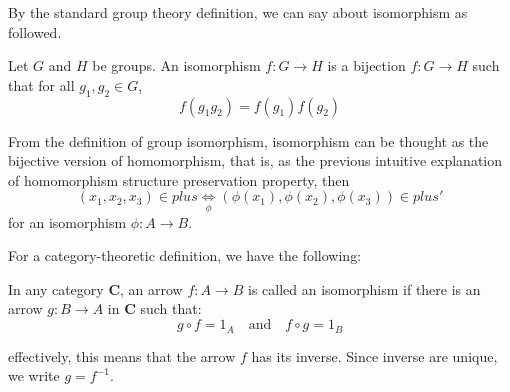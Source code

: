 By the standard group theory definition, we can say about isomorphism as followed.
\begin{definition}
    Let $G$ and $ H $ be groups. An isomorphism $ f: G \longrightarrow H $ is a bijection $ f:G \longrightarrow H $ such that for all $g_1, g_2 \in G$, 
    \begin{equation*}
        f(g_1 g_2) = f(g_1) f(g_2)
    \end{equation*}
\end{definition}
From the definition of group isomorphism, isomorphism can be thought as the bijective version of homomorphism, that is, as the previous intuitive explanation of homomorphism structure preservation property, then 
\begin{equation*}
    (x_1,x_2,x_3) \in plus \underset{\phi}{\iff} (\phi(x_1),\phi(x_2),\phi(x_3)) \in plus'
\end{equation*}
for an isomorphism $\phi: A \longrightarrow B$.

For a category-theoretic definition, we have the following: 

\begin{definition}
    In any category $\mathbf{C}$, an arrow $f:A\to B$ is called an isomorphism if there is an arrow $g: B \to A$ in $\mathbf{C}$ such that: 
    \begin{equation*}
        g \circ f = 1_A \quad \text{and} \quad f \circ g = 1_B
    \end{equation*}
\end{definition}

effectively, this means that the arrow $f$ has its inverse. Since inverse are unique, we write $g=f^{-1}$. 
